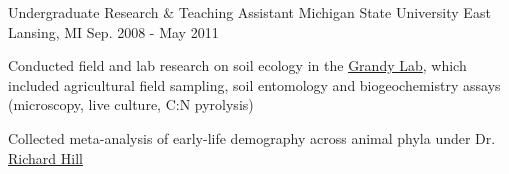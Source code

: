 \begin{cventries}
  \cventry
    {Undergraduate Research \& Teaching Assistant} %
    {Michigan State University} %
    {East Lansing, MI} %
    {Sep. 2008 - May 2011} %
    {
      \begin{cvitems} %
        \item {Conducted field and lab research on soil ecology in the \href{http://unh.edu/grandylab/}{Grandy Lab}, which included agricultural field sampling, soil entomology and biogeochemistry assays (microscopy, live culture, C:N pyrolysis)}
        \item {Collected meta-analysis of early-life demography across animal phyla under Dr. \href{https://integrativebiology.natsci.msu.edu/about/directory/hill-richard/}{Richard Hill}}
      \end{cvitems}
    }

\end{cventries}
